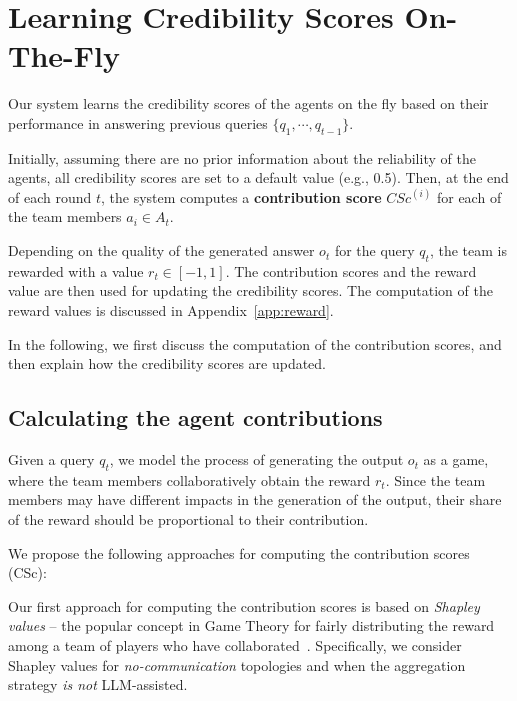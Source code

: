 


\section{Learning Credibility Scores On-The-Fly}\label{sec:tech-details}
 
Our system learns the credibility scores of the agents on the fly based on their performance in answering previous queries $\{q_1,\cdots, q_{t-1}\}$.

Initially, assuming there are no prior information about the reliability of the agents, all credibility scores are set to a default value (e.g., 0.5).
Then, at the end of each round $t$, the system computes a {\bf contribution score} $CSc^{(i)}$ for each of the team members $a_i\in A_t$.

Depending on the quality of the generated answer $o_t$ for the query $q_t$, the team is rewarded with a value $r_t\in[-1,1]$. The contribution scores and the reward value are then used for updating the credibility scores. The computation of the reward values is discussed in Appendix~\ref{app:reward}.

In the following, we first discuss the computation of the contribution scores, and then explain how the credibility scores are updated.

\subsection{Calculating the agent contributions}\label{sec:tech-details-Csc}

Given a query $q_t$, we model the process of generating the output $o_t$ as a game, where the team members collaboratively obtain the reward $r_t$.
Since the team members may have different impacts in the generation of the output, their share of the reward should be proportional to their contribution.

We propose the following approaches for computing the contribution scores (CSc):

\vspace{1mm}
Our first approach for computing the contribution scores is based on {\em Shapley values} -- the popular concept in Game Theory for fairly distributing the reward among a team of players who have collaborated~\cite{shapley1951notes}.
Specifically, we consider Shapley values for {\em no-communication} topologies and when the aggregation strategy {\em is not} LLM-assisted.



